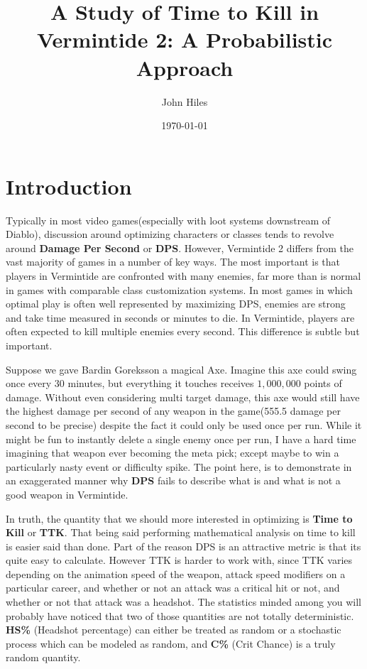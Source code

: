 \documentclass{article}
\title{A Study of Time to Kill in Vermintide 2: A Probabilistic Approach}
\author{John Hiles}
\date\today
\begin{document}
\maketitle %

\section{Introduction}

\par

	Typically in most video games(especially with loot systems downstream of Diablo), discussion around optimizing characters or classes tends to revolve around \textbf{Damage Per Second} or \textbf{DPS}. However, Vermintide 2 differs from the vast majority of games in a number of key ways. The most important is that players in Vermintide are confronted with many enemies, far more than is normal in games with comparable class customization systems. In most games in which optimal play is often well represented by maximizing DPS, enemies are strong and take time measured in seconds or minutes to die. In Vermintide, players are often expected to kill multiple enemies every second. This difference is subtle but important.

Suppose we gave Bardin Goreksson a magical Axe. Imagine this axe could swing once every 30 minutes, but everything it touches receives $1,000,000$ points of damage. Without even considering multi target damage, this axe would still have the highest damage per second of any weapon in the game(555.5 damage per second to be precise) despite the fact it could only be used once per run. While it might be fun to instantly delete a single enemy once per run, I have a hard time imagining that weapon ever becoming the meta pick; except maybe to win a particularly nasty event or difficulty spike. The point here, is to demonstrate in an exaggerated manner why \textbf{DPS} fails to describe what is and what is not a good weapon in Vermintide.

In truth, the quantity that we should more interested in optimizing is \textbf{Time to Kill} or \textbf{TTK}. That being said performing mathematical analysis on time to kill is easier said than done. Part of the reason DPS is an attractive metric is that its quite easy to calculate. However TTK is harder to work with, since TTK varies depending on the animation speed of the weapon, attack speed modifiers on a particular career, and whether or not an attack was a critical hit or not, and whether or not that attack was a headshot. The statistics minded among you will probably have noticed that two of those quantities are not totally deterministic. \textbf{HS\%} (Headshot percentage) can either be treated as random or a stochastic process which can be modeled as random, and \textbf{C\%} (Crit Chance) is a truly random quantity.
\end{document}

